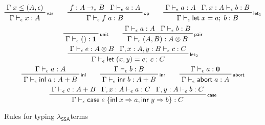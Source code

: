 \documentclass[acmsmall,screen,review]{acmart}
\newcommand{\mb}[1]{\ensuremath{\mathbf{#1}}}
\newcommand{\ms}[1]{\ensuremath{\mathsf{#1}}}
\newcommand{\lto}{\Rightarrow}
\newcommand{\linl}[1]{\ms{inl}\;{#1}}
\newcommand{\linr}[1]{\ms{inr}\;{#1}}
\newcommand{\labort}[1]{\ms{abort}\;{#1}}
\newcommand{\letexpr}[3]{\ensuremath{\ms{let}\;#1 = #2;\;#3}}
\newcommand{\caseexpr}[5]{\ms{case}\;#1\;\{\linl{#2} \lto #3, \linr{#4} \lto #5\}}
\newcommand{\bhyp}[2]{#1 : #2}
\newcommand{\rle}[1]{{\scriptsize\textsf{#1}}}
\newcommand{\hasty}[4]{#1 \vdash_{#2} #3: {#4}}
\newcommand{\isop}[4]{#1: #2 \to_{#4} #3}
\newcommand{\isotopessa}{\(\lambda_{\ms{SSA}}\)}
\begin{document}
\begin{figure}[H]
  \begin{gather*}
    \prftree[r]{\rle{var}}{\Gamma\;x \leq (A, \epsilon)}{\hasty{\Gamma}{\epsilon}{x}{A}} \qquad
    \prftree[r]{\rle{op}}{\isop{f}{A}{B}{\epsilon}}{\hasty{\Gamma}{\epsilon}{a}{A}}
      {\hasty{\Gamma}{\epsilon}{f\;a}{B}} \qquad
    \prftree[r]{\rle{let$_1$}}
      {\hasty{\Gamma}{\epsilon}{a}{A}}
      {\hasty{\Gamma, \bhyp{x}{A}}{\epsilon}{b}{B}}
      {\hasty{\Gamma}{\epsilon}{\letexpr{x}{a}{b}}{B}} \\
    \prftree[r]{\rle{unit}}{\hasty{\Gamma}{\epsilon}{()}{\mb{1}}} \qquad
    \prftree[r]{\rle{pair}}{\hasty{\Gamma}{\epsilon}{a}{A}}{\hasty{\Gamma}{\epsilon}{b}{B}}
      {\hasty{\Gamma}{\epsilon}{(A, B)}{A \otimes B}} \\
    \prftree[r]{\rle{let$_2$}}
      {\hasty{\Gamma}{\epsilon}{e}{A \otimes B}}
      {\hasty{\Gamma, \bhyp{x}{A}, \bhyp{y}{B}}{\epsilon}{c}{C}}
      {\hasty{\Gamma}{\epsilon}{\letexpr{(x, y)}{e}{c}}{C}} \\
    \prftree[r]{\rle{inl}}{\hasty{\Gamma}{\epsilon}{a}{A}}
      {\hasty{\Gamma}{\epsilon}{\linl{a}}{A + B}} \qquad
    \prftree[r]{\rle{inr}}{\hasty{\Gamma}{\epsilon}{b}{B}}
      {\hasty{\Gamma}{\epsilon}{\linr{b}}{A + B}} \qquad
    \prftree[r]{\rle{abort}}{\hasty{\Gamma}{\epsilon}{a}{\mb{0}}}
      {\hasty{\Gamma}{\epsilon}{\labort{a}}{A}} \\
    \prftree[r]{\rle{case}}
      {\hasty{\Gamma}{\epsilon}{e}{A + B}}
      {\hasty{\Gamma, \bhyp{x}{A}}{\epsilon}{a}{C}}
      {\hasty{\Gamma, \bhyp{y}{A}}{\epsilon}{b}{C}}
      {\hasty{\Gamma}{\epsilon}{\caseexpr{e}{x}{a}{y}{b}}{C}}
  \end{gather*}
  \caption{Rules for typing \isotopessa terms}
  \label{fig:ssa-term-rules}
\end{figure}
\end{document}
